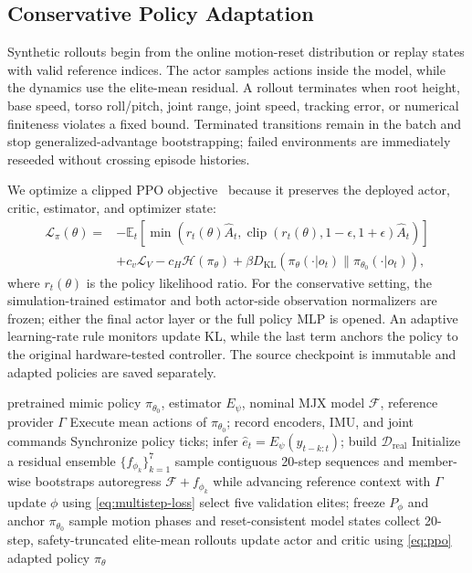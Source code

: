\documentclass[10pt,twocolumn]{article}
\newcommand{\E}{\mathbb{E}}
\newcommand{\cD}{\mathcal{D}}
\newcommand{\cL}{\mathcal{L}}
\newcommand{\cF}{\mathcal{F}}
\begin{document}
\subsection{Conservative Policy Adaptation}
\label{sec:policy}

Synthetic rollouts begin from the online motion-reset distribution or replay states with valid reference indices. The actor samples actions inside the model, while the dynamics use the elite-mean residual. A rollout terminates when root height, base speed, torso roll/pitch, joint range, joint speed, tracking error, or numerical finiteness violates a fixed bound. Terminated transitions remain in the batch and stop generalized-advantage bootstrapping; failed environments are immediately reseeded without crossing episode histories.

We optimize a clipped PPO objective~\cite{schulman2017ppo} because it preserves the deployed actor, critic, estimator, and optimizer state:
\begin{align}
\cL_\pi(\theta)={}&-\E_t\left[\min\left(r_t(\theta)\hat A_t,
\operatorname{clip}(r_t(\theta),1-\epsilon,1+\epsilon)\hat A_t\right)\right]\nonumber\\
&+c_v\cL_V-c_H\mathcal{H}(\pi_\theta)
+\beta D_{\mathrm{KL}}(\pi_\theta(\cdot|o_t)\|\pi_{\theta_0}(\cdot|o_t)),
\label{eq:ppo}
\end{align}
where $r_t(\theta)$ is the policy likelihood ratio. For the conservative setting, the simulation-trained estimator and both actor-side observation normalizers are frozen; either the final actor layer or the full policy MLP is opened. An adaptive learning-rate rule monitors update KL, while the last term anchors the policy to the original hardware-tested controller. The source checkpoint is immutable and adapted policies are saved separately.

\begin{algorithm}[t]
\caption{External-mocap-free mimic adaptation}
\label{alg:method}
\begin{algorithmic}[1]
\Require pretrained mimic policy $\pi_{\theta_0}$, estimator $E_\psi$, nominal MJX model $\cF$, reference provider $\Gamma$
\State Execute mean actions of $\pi_{\theta_0}$; record encoders, IMU, and joint commands
\State Synchronize policy ticks; infer $\hat e_t=E_\psi(y_{t-k:t})$; build $\cD_{\mathrm{real}}$
\State Initialize a residual ensemble $\{f_{\phi_k}\}_{k=1}^7$
    \State sample contiguous 20-step sequences and member-wise bootstraps
    \State autoregress $\cF+f_{\phi_k}$ while advancing reference context with $\Gamma$
    \State update $\phi$ using \cref{eq:multistep-loss}
\EndFor
\State select five validation elites; freeze $P_\phi$ and anchor $\pi_{\theta_0}$
    \State sample motion phases and reset-consistent model states
    \State collect 20-step, safety-truncated elite-mean rollouts
    \State update actor and critic using \cref{eq:ppo}
\EndFor
\State \Return adapted policy $\pi_\theta$
\end{algorithmic}
\end{algorithm}
\end{document}
